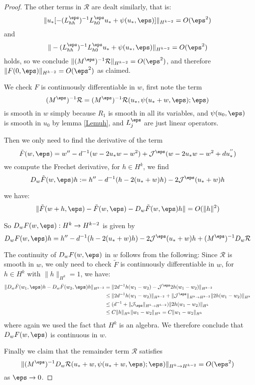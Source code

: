 \begin{proof}
The other terms  in $\mathcal{R}$ are dealt similarly, that is:
\[
\|u_*[-(L_{hh}^{\eps})^{-1}L_{h0}^{\eps}u_* +\psi(u_*,\eps)]\|_{H^{k-2}} = O(\eps^2)\]
and 
\[
\|-(L_{hh}^{\eps})^{-1}L_{h0}^{\eps}u_*+\psi(u_*,\eps)\|_{H^{k-2}} = O(\eps^2)
\]
holds, so we conclude $\|(M^{\eps})^{-1}\mathcal{R}\|_{H^{k-2}} = O(\eps^2)$, and therefore $\|F(0,\eps)\|_{H^{k-2}} = O(\eps^2)$ as claimed.

 We check $F$ is continuously differentiable in $w$, first note the term 
\[
(M^\eps)^{-1}\mathcal{R}= (M^\eps)^{-1}\mathcal{R}(u_*,\psi(u_*+w,\eps);\eps)
\] is smooth in $w$ simply because $R_1$ is smooth in all its variables, and $\psi(u_0,\eps)$ is smooth in $u_0$ by lemma \ref{Lemuh}, and $L_j^\eps$ are just linear operators.

Then we only need to find the derivative of the term 
\[
\tilde{F}(w,\eps)= w'' - d^{-1}(w-2u_*w-w^2)+\mathcal{J}^{\eps}(w-2u_*w-w^2+du_*^{''})
\]
we compute the Frechet derivative, for $h \in H^k$, we find
\[
D_w\tilde{F}(w,\eps) h := h''-d^{-1}(h - 2(u_*+w)h)-2\mathcal{J}^{\eps}(u_*+w)h
\]

we have:
\begin{align*}
\|\tilde{F}(w+h,\eps)-\tilde{F}(w,\eps) - D_w\tilde{F}(w,\eps) h\| = O(\|h\|^2)
\end{align*}

So $D_wF(w,\eps) : H^k \to H^{k-2}$ is given by 
\[
D_wF(w,\eps) h = h''-d^{-1}(h - 2(u_*+w)h)-2\mathcal{J}^{\eps}(u_*+w)h + (M^\eps)^{-1}D_w\mathcal{R}
\]


The continuity of $D_wF(w,\eps)$ in $w$ follows from the following: Since $\mathcal{R}$ is smooth in $w$, we only need to check $\tilde{F}$ is continuously differentiable in $w$, for $h \in H^k$ with $\|h\|_{H^k}=1$, we have:
\begin{align*}
\| D_w\tilde{F}(w_1,\eps)h-D_w\tilde{F}(w_2,\eps)h\|_{H^{k-2}} &=\| 2d^{-1}h(w_1-w_2)-\mathcal{J}^{\eps} 2h(w_1-w_2)\|_{H^{k-2}} \\
& \le \| 2d^{-1}h(w_1-w_2)\|_{H^{k-2}}+\|\mathcal{J}^{\eps}\|_{H^k \to H^{k-2}}\| 2h(w_1-w_2)\|_{H^k} \\
& \le (d^{-1}+\|\mathcal{J}_\eps\|_{H^k\to H^{k-2}}) \|2h(w_1-w_2) \|_{H^k} \\
& \le C \|h\|_{H^k} \|w_1-w_2\|_{H^k} = C\|w_1-w_2\|_{H^k}
\end{align*}
where again we used the fact that $H^k$ is an algebra.  We therefore conclude that $D_wF(w,\eps)$ is continuous in $w$.


Finally we claim that the remainder term $\mathcal{R}$ satisfies 
\[
\|(M^{\eps})^{-1}D_w\mathcal{R}(u_*+w,\psi(u_*+w,\eps);\eps) \|_{H^k \to H^{k-2}}= O(\eps^2)
\]
as $\eps \to 0$.


\end{proof}
